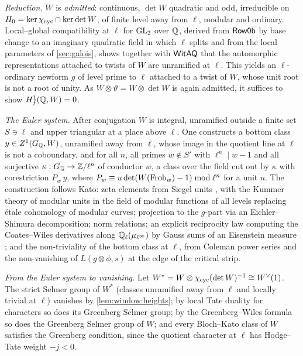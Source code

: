\begin{proofoutline}
\emph{Reduction.} $W$ is \emph{admitted}: continuous, $\det W$ quadratic and odd, irreducible on
$H_0=\ker\chi_{\mathrm{cyc}}\cap\ker\det W$, of finite level away from $\ell$, modular and ordinary. Local--global
compatibility at $\ell$ for $\operatorname{GL}_2$ over $\mathbb{Q}$, derived from $\mathsf{Row0b}$ by base change to an imaginary
quadratic field in which $\ell$ splits and from the local parameters of \cref{sec:galois}, shows together with
$\mathsf{WitAQ}$ that the automorphic representations attached to twists of $W$ are unramified at $\ell$. This
yields an $\ell$-ordinary newform $g$ of level prime to $\ell$ attached to a twist of $W$, whose unit root is not a
root of unity. As $W\otimes\vartheta=W\otimes\det W$ is again admitted, it suffices to show $H^1_{f}(\mathbb{Q},W)=0$.

\emph{The Euler system.} After conjugation $W$ is integral, unramified outside a finite set $S\ni\ell$ and upper
triangular at a place above $\ell$. One constructs a bottom class $y\in Z^1(G_{\mathbb{Q}},W)$, unramified away from $\ell$,
whose image in the quotient line at $\ell$ is not a coboundary, and for all $n$, all primes $w\notin S'$ with
$\ell^n\mid w-1$ and all surjective $\kappa:G_{\mathbb{Q}}\to\mathbb{Z}/\ell^n$ of conductor $w$, a class over the field cut out by
$\kappa$ with corestriction $P_w\,y$, where $P_w\equiv u\det(W(\operatorname{Frob}_w)-1)\bmod\ell^n$ for a unit $u$. The construction
follows Kato: zeta elements from Siegel units \cite{KubertLang1981}, with the Kummer theory of modular units in the
field of modular functions of all levels \cite{Shimura1971} replacing \'etale cohomology of modular curves;
projection to the $g$-part via an Eichler--Shimura decomposition; norm relations; an explicit reciprocity law
computing the Coates--Wiles derivatives along $\mathbb{Q}_\ell(\mu_{\ell^\infty})$ by Gauss sums of an Eisenstein measure
\cite{CoatesWiles1977,Coleman1979}; and the non-triviality of the bottom class at $\ell$, from Coleman power series and
the non-vanishing of $L(g\otimes\phi,s)$ at the edge of the critical strip.

\emph{From the Euler system to vanishing.} Let $W^*=W\otimes\chi_{\mathrm{cyc}}(\det W)^{-1}\cong W^\vee(1)$. The strict Selmer
group of $W^*$ (classes unramified away from $\ell$ and locally trivial at $\ell$) vanishes by
\cref{lem:window:heights}; by local Tate duality for characters so does its Greenberg Selmer group; by the
Greenberg--Wiles formula so does the Greenberg Selmer group of $W$; and every Bloch--Kato class of $W$ satisfies the
Greenberg condition, since the quotient character at $\ell$ has Hodge--Tate weight $-j<0$.
\end{proofoutline}

